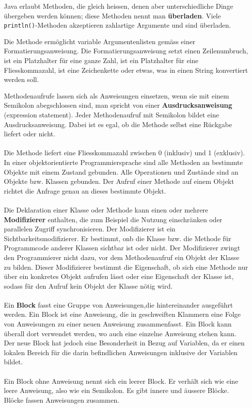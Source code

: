 Java erlaubt Methoden, die gleich heissen, denen aber unterschiedliche Dinge übergeben werden können; diese Methoden nennt man \textbf{überladen}. Viele \texttt{println()}-Methoden akzeptieren zahlartige Argumente und sind überladen.

Die Methode  ermöglicht variable Argumentenlisten gemäss einer Formatierungsanweisung. Die Formatierungsanweisung  setzt einen Zeilenumbruch,  ist ein Platzhalter für eine ganze Zahl,  ist ein Platzhalter für eine Fliesskommazahl,  ist eine Zeichenkette oder etwas, was in einen String konvertiert werden soll.

Methodenaufrufe lassen sich als Anweisungen einsetzen, wenn sie mit einem Semikolon abegschlossen sind, man spricht von einer \textbf{Ausdrucksanweisung} (expression statement). Jeder Methodenaufruf mit Semikolon bildet eine Ausdrucksanweisung. Dabei ist es egal, ob die Methode selbst eine Rückgabe liefert oder nicht.
\\\\
Die Methode  liefert eine Fliesskommazahl zwischen 0 (inklusiv) und 1 (exklusiv). In einer objektorientierte Programmiersprache sind alle Methoden an bestimmte Objekte mit einem Zustand gebunden. Alle Operationen und Zustände sind an Objekte bzw. Klassen gebunden. Der Aufruf einer Methode auf einem Objekt richtet die Anfrage genau an dieses bestimmte Objekt.
\\\\
Die Deklaration einer Klasse oder Methode kann einen oder mehrere \textbf{Modifizierer} enthalten, die zum Beispiel die Nutzung einschränken oder parallelen Zugriff synchronisieren. Der Modifizierer  ist ein Sichtbarkeitsmodifizierer. Er bestimmt, onb die Klasse bzw. die Methode für Programmcode anderer Klassen sichtbar ist oder nicht. Der Modifizierer  zwingt den Programmierer nicht dazu, vor dem Methodenaufruf ein Objekt der Klasse zu bilden. Dieser Modifizierer bestimmt die Eigenschaft, ob sich eine Methode nur über ein konkretes Objekt aufrufen lässt oder eine Eigenschaft der Klasse ist, sodass für den Aufruf kein Objekt der Klasse nötig wird.
\\\\
Ein \textbf{Block} fasst eine Gruppe von Anweisungen,die hintereinander ausgeführt werden. Ein Block \boxed{\textbf{\texttt{\{\}}}} ist eine Anweisung, die in geschweiften Klammern eine Folge von Anweisungen zu einer neuen Anweisung zusammenfasst. Ein Block kann überall dort verwendet werden, wo auch eine einzelne Anweisung stehen kann. Der neue Block hat jedoch eine Besonderheit in Bezug auf Variablen, da er einen lokalen Bereich für die darin befindlichen Anweisungen inklusive der Variablen bildet.
\\\\
Ein Block ohne Anweisung nennt sich ein leerer Block. Er verhält sich wie eine leere Anweisung, also wie ein Semikolon. Es gibt innere und äussere Blöcke. Blöcke fassen Anweisungen zusammen.
